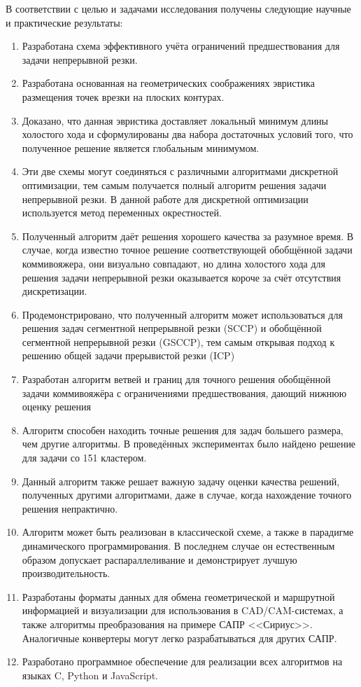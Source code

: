 В соответствии с целью и задачами исследования получены следующие
научные и практические результаты:

\begin{enumerate}
    \item
    Разработана схема эффективного учёта ограничений предшествования для
    задачи непрерывной резки.
    \item
    Разработана основанная на геометрических соображениях эвристика
    размещения точек врезки на плоских контурах.
    \item
    Доказано, что данная эвристика доставляет локальный минимум длины холостого хода
    и сформулированы два набора достаточных условий того,
    что полученное решение является глобальным минимумом.
    \item
    Эти две схемы могут соединяться с различными алгоритмами дискретной оптимизации,
    тем самым получается полный алгоритм решения задачи непрерывной резки.
    В данной работе для дискретной оптимизации используется
    метод переменных окрестностей.
    \item
    Полученный алгоритм даёт решения хорошего качества за разумное время.
    В случае, когда известно точное решение соответствующей обобщённой
    задачи коммивояжера, они визуально совпадают, но длина холостого
    хода для решения задачи непрерывной резки оказывается короче за счёт
    отсутствия дискретизации.
    \item
    Продемонстрировано, что полученный алгоритм может использоваться для
    решения задач сегментной непрерывной резки (SCCP)
    и обобщённой сегментной непрерывной резки (GSCCP),
    тем самым открывая подход к решению общей задачи прерывистой резки
    (ICP)
    \item
    Разработан алгоритм ветвей и границ для точного решения
    обобщённой задачи коммивояжёра с ограничениями предшествования,
    дающий нижнюю оценку решения
    \item
    Алгоритм способен находить точные решения для задач большего размера,
    чем другие алгоритмы.
    В проведённых экспериментах было найдено решение для
    задачи со 151 кластером.
    \item
    Данный алгоритм также решает важную задачу оценки качества
    решений, полученных другими алгоритмами,
    даже в случае, когда нахождение точного решения непрактично.
    \item
    Алгоритм может быть реализован в классической схеме,
    а также в парадигме динамического программирования.
    В последнем случае он естественным образом допускает
    распараллеливание и демонстрирует лучшую производительность.
    \item
    Разработаны форматы данных для обмена геометрической и маршрутной
    информацией и визуализации для использования в CAD/CAM-системах,
    а также алгоритмы преобразования на примере САПР <<Сириус>>.
    Аналогичные конвертеры могут легко разрабатываться для других САПР.
    \item
    Разработано программное обеспечение для реализации всех алгоритмов
    на языках C, Python и JavaScript.
\end{enumerate}

